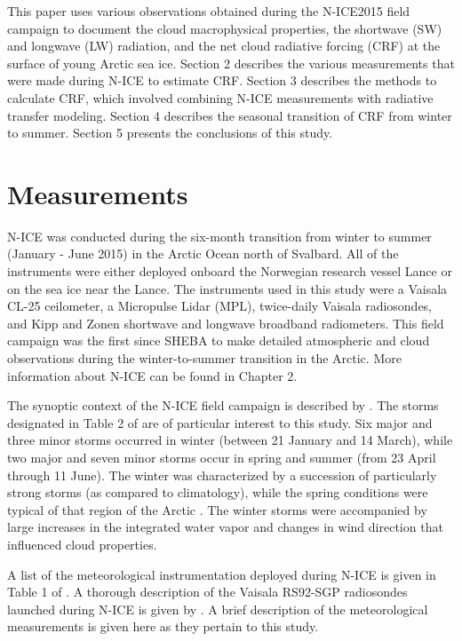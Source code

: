 This paper uses various observations obtained during the N-ICE2015 field campaign to document the cloud macrophysical properties, the shortwave (SW) and longwave (LW) radiation, and the net cloud radiative forcing (CRF) at the surface of young Arctic sea ice. Section 2 describes the various measurements that were made during N-ICE to estimate CRF. Section 3 describes the methods to calculate CRF, which involved combining N-ICE measurements with radiative transfer modeling. Section 4 describes the seasonal transition of CRF from winter to summer. Section 5 presents the conclusions of this study.

\section{Measurements}
N-ICE was conducted during the six-month transition from winter to summer (January - June 2015) in the Arctic Ocean north of Svalbard. All of the instruments were either deployed onboard the Norwegian research vessel Lance or on the sea ice near the Lance. The instruments used in this study were a Vaisala CL-25 ceilometer, a Micropulse Lidar (MPL), twice-daily Vaisala radiosondes, and Kipp and Zonen shortwave and longwave broadband radiometers. This field campaign was the first since SHEBA to make detailed atmospheric and cloud observations during the winter-to-summer transition in the Arctic. More information about N-ICE can be found in Chapter 2. 

The synoptic context of the N-ICE field campaign is described by \citet{cohen:2017}. The storms designated in Table 2 of \citet{cohen:2017} are of particular interest to this study. Six major and three minor storms occurred in winter (between 21 January and 14 March), while two major and seven minor storms occur in spring and summer (from 23 April through 11 June). The winter was characterized by a succession of particularly strong storms (as compared to climatology), while the spring conditions were typical of that region of the Arctic \citep{graham:2017}. The winter storms were accompanied by large increases in the integrated water vapor and changes in wind direction \citep{kayser:2017} that influenced cloud properties.  

A list of the meteorological instrumentation deployed during N-ICE is given in Table 1 of \citet{cohen:2017}. A thorough description of the Vaisala RS92-SGP radiosondes launched during N-ICE is given by \citet{kayser:2017}. A brief description of the meteorological measurements is given here as they pertain to this study.

